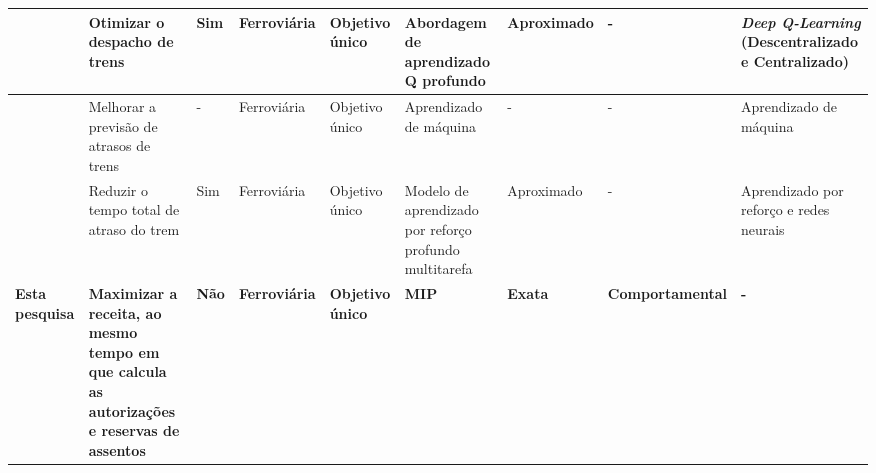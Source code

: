 \begin{center}
\begin{longtable}{|M{2cm}|M{3.3cm}|M{0.5cm}|M{1.1cm}|M{1cm}|M{1.7cm}|M{1.7cm}|M{1.7cm}|M{1.5cm}|}
		\citep{AGASUCCI2023}      &  Otimizar o despacho de trens                                                                                                                         & Sim                 & Ferroviária          &  Objetivo único          &  Abordagem de aprendizado Q profundo                     & Aproximado                                      & -                        &  \textit{Deep Q-Learning} (Descentralizado e Centralizado)          \\ \hline
		\citep{SARHANI2024100120} &  Melhorar a previsão de atrasos de trens                                                                                                              & -                   & Ferroviária          &  Objetivo único          &  Aprendizado de máquina                                  & -                                               & -                        &  Aprendizado de máquina                                    \\ \hline
		\citep{TANG2025103900}    &  Reduzir o tempo total de atraso do trem                                                                                                              & Sim                 & Ferroviária          &  Objetivo único          &  Modelo de aprendizado por reforço profundo multitarefa  & Aproximado                                      & -                        &  Aprendizado por reforço e redes neurais                   \\ \hline
		\textbf{Esta pesquisa}    &  \textbf{Maximizar a receita, ao mesmo tempo em que calcula as autorizações e reservas de assentos}                                                   & \textbf{Não}        & \textbf{Ferroviária} &  \textbf{Objetivo único} &  \textbf{MIP}                                            & \textbf{Exata}                                  & \textbf{Comportamental}  & \textbf{-}                                                \\ \hline
	\end{longtable}
\end{center}


